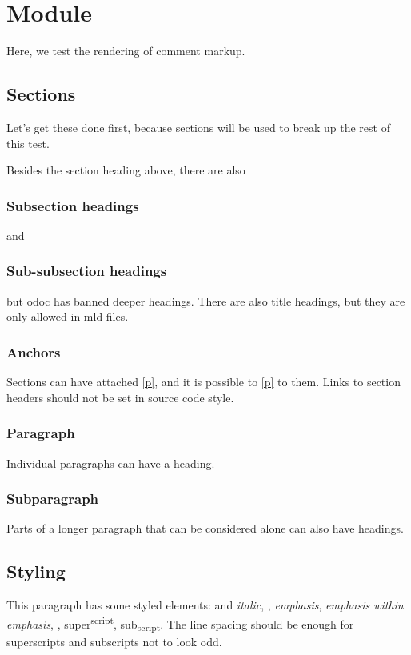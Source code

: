 \section{Module }\label{Markup}%
Here, we test the rendering of comment markup.

\subsection{Sections\label{Markup--sections}}%
Let's get these done first, because sections will be used to break up the rest of this test.

Besides the section heading above, there are also

\subsubsection{Subsection headings\label{Markup--subsection-headings}}%
and

\subsubsection{Sub-subsection headings\label{Markup--sub-subsection-headings}}%
but odoc has banned deeper headings. There are also title headings, but they are only allowed in mld files.

\subsubsection{Anchors\label{Markup--anchors}}%
Sections can have attached \hyperref[Markup--anchors]{[p\pageref*{Markup--anchors}]}, and it is possible to \hyperref[Markup--anchors]{[p\pageref*{Markup--anchors}]} to them. Links to section headers should not be set in source code style.

\subsubsection{Paragraph\label{Markup--paragraph}}%
Individual paragraphs can have a heading.

\subsubsection{Subparagraph\label{Markup--subparagraph}}%
Parts of a longer paragraph that can be considered alone can also have headings.

\subsection{Styling\label{Markup--styling}}%
This paragraph has some styled elements:  and \emph{italic}, , \emph{emphasis}, \emph{\emph{emphasis} within emphasis}, , super\textsuperscript{script}, sub\textsubscript{script}. The line spacing should be enough for superscripts and subscripts not to look odd.

